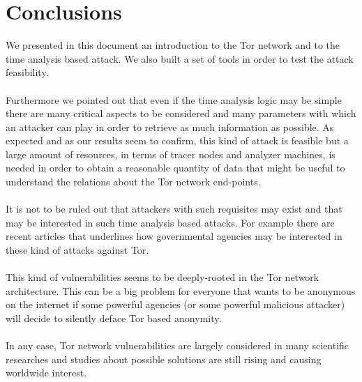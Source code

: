 \section{Conclusions}
We presented in this document an introduction to the Tor network and to
the time analysis based attack. We also built a set of tools in order
to test the attack feasibility. 
\\\\
Furthermore we pointed out that even if the time analysis logic may be simple there are many critical
aspects to be considered and many parameters with which an attacker can
play in order to retrieve as much information as possible. As expected
and as our
results seem to confirm, this kind of attack is feasible but a large
amount of resources, in terms of tracer nodes and analyzer machines, 
is needed in order to obtain a reasonable quantity of data that might be useful to
understand the relations about the Tor network end-points. 
\\\\
It is not to
be ruled out that attackers with such requisites may exist and that may be
interested in such time analysis based attacks. For example there are recent
articles\cite{vantor}\cite{schneier2013attacking} that underlines how
governmental agencies may be interested in
these kind of attacks against Tor.  
\\\\
This kind of vulnerabilities seems to be deeply-rooted in the Tor network architecture.
This can be a big problem for everyone that wants to be anonymous on the internet if
some powerful agencies (or some powerful malicious attacker) will decide to
silently deface Tor based anonymity.
\\\\
In any case, Tor network vulnerabilities are largely considered in many
scientific researches and studies about possible solutions are still
rising and causing worldwide interest.

